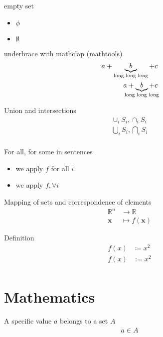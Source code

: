 \documentclass[dvipdfmx]{article}
\begin{document}
empty set
\begin{itemize}
  \item $\phi$
  \item $\emptyset$
\end{itemize}

underbrace with mathclap (mathtools)
\begin{equation}
\begin{aligned}
  a + \underbrace{b}_{\text{long long long}} + c \\
  a + \underbrace{b}_{\mathclap{\text{long long long}}} + c \\
\end{aligned}
\end{equation}

Union and intersections
\begin{equation}
\begin{aligned}
  \cup_i S_i, \cap_i S_i \\
  \bigcup_i S_i, \bigcap_i S_i \\
\end{aligned}
\end{equation}

For all, for some in sentences
\begin{itemize}
  \item we apply $f$ for all $i$
  \item we apply $f, \forall i$ 
\end{itemize}

Mapping of sets and correspondence of elements
\begin{equation}
\begin{aligned}
  \mathbb{R}^n &\rightarrow \mathbb{R} \\
  \boldsymbol{x} &\mapsto f(\boldsymbol{x})
\end{aligned}
\end{equation}

Definition
\begin{equation}
\begin{aligned}
  f(x) &\coloneqq x^2 \\
  f(x) &:= x^2 \\
\end{aligned}
\end{equation}

\section{Mathematics}

A specific value $a$ belongs to a set $A$
\begin{equation}
\begin{aligned}
  a \in A
\end{aligned}
\end{equation}
\end{document}

